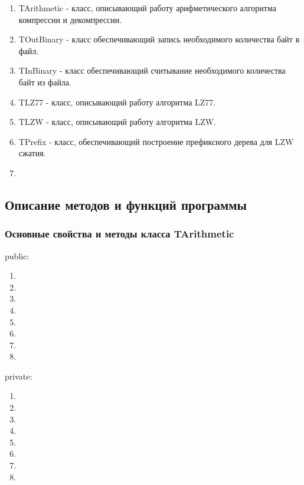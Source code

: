 \documentclass[12pt]{article}
\begin{document}
\begin{enumerate}%
	\item TArithmetic - класс, описывающий работу арифметического алгоритма компрессии и декомпрессии.
	\item TOutBinary - класс обеспечивающий запись необходимого количества байт в файл.
	\item TInBinary - класс обеспечивающий считывание необходимого количества байт из файла.
	\item TLZ77 - класс, описывающий работу алгоритма LZ77.
	\item TLZW - класс, описывающий работу алгоритма LZW.
	\item TPrefix - класс, обеспечивающий построение префиксного дерева для LZW сжатия.
	\item 
\end{enumerate}

\subsection*{Описание методов и функций программы}

\subsubsection*{Основные свойства и методы класса TArithmetic}%
\noindent
public:

\begin{enumerate}
	\item 
	\item 
	\item 
	\item 
	\item 
	\item 
	\item 
	\item 
\end{enumerate}
\noindent
private:

\begin{enumerate}
	\item 
	\item 
	\item 
	\item 
	\item 
	\item 
	\item 
	\item 
\end{enumerate}
\end{document}
